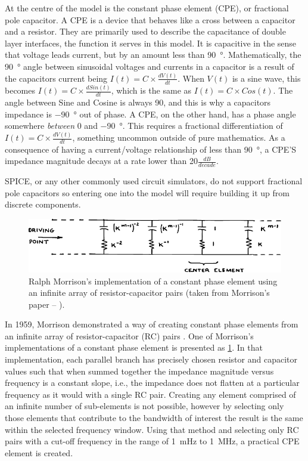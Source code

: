     At the centre of the model is the constant phase element (CPE), or fractional pole capacitor.
    A CPE is a device that behaves like a cross between a capacitor and a resistor.
    They are primarily used to describe the capacitance of double layer interfaces, the function it serves in this model.
    It is capacitive in the sense that voltage leads current, but by an amount less than \SI{90}{\degree}.
    Mathematically, the \SI{90}{\degree} angle between sinusoidal voltages and currents in a capacitor is a result of the capacitors current being $I(t) = C \times \frac{dV(t)}{dt}$.
    When $V(t)$ is a sine wave, this becomes $I(t) = C \times \frac{d Sin(t)}{dt}$, which is the same as $I(t) = C \times Cos(t)$.
    The angle between Sine and Cosine is always 90, and this is why a capacitors impedance is \SI{-90}{\degree} out of phase.
    A CPE, on the other hand, has a phase angle somewhere \emph{between} 0 and \SI{-90}{\degree}.
    This requires a fractional differentiation of $I(t) = C \times \frac{dV(t)}{dt}$, something uncommon outside of pure mathematics.
    As a consequence of having a current/voltage relationship of less than \SI{90}{\degree}, a CPE'S impedance magnitude decays at a rate lower than 20$\frac{dB}{decade}$.

    SPICE, or any other commonly used circuit simulators, do not support fractional pole capacitors so entering one into the model will require building it up from discrete components.
    \begin{figure}[h]
      \centering
      \includegraphics{content/pt2/07-InterfaceModel/graphics/Morrison-RC}
      \caption{\label{graph:pt2-morrisonCPE}Ralph Morrison's implementation of a constant phase element using an infinite array of resistor-capacitor pairs (taken from Morrison's paper -- \cite{Morrison1959}).}
    \end{figure}
    In 1959, Morrison demonstrated a way of creating constant phase elements from an infinite array of resistor-capacitor (RC) pairs \cite{Morrison1959}.
    One of Morrison's implementations of a constant phase element is presented as \cref{graph:pt2-morrisonCPE}.
    In that implementation, each parallel branch has precisely chosen resistor and capacitor values such that when summed together the impedance magnitude versus frequency is a constant slope, i.e., the impedance does not flatten at a particular frequency as it would with a single RC pair.
    Creating any element comprised of an infinite number of sub-elements is not possible, however by selecting only those elements that contribute to the bandwidth of interest the result is the same within the selected frequency window.
    Using that method and selecting only RC pairs with a cut-off frequency in the range of \SI{1}{\milli\hertz} to \SI{1}{\mega\hertz}, a practical CPE element is created.

